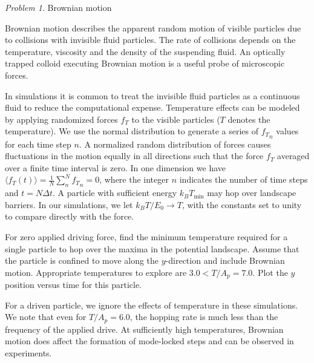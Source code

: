 \documentclass[preprint,showpacs,preprintnumbers,amsmath,amssymb,aps,prb]{revtex4-1}
\theoremstyle{remark}
\newtheorem{problem}{Problem}
\begin{document}
 \begin{problem}{Brownian motion}
  \label{ex:brownian}
  
\noindent Brownian motion describes the apparent random motion     of 
  visible particles  
  due to collisions with invisible fluid particles.
  The rate of collisions depends on the temperature, viscosity
  and the density of 
  the suspending fluid.\cite{Einstein1905}
  An optically trapped colloid executing Brownian motion
  is a useful probe of microscopic forces.\cite{Volpe2013}
  
  In   simulations
  it is common to treat the 
  invisible fluid particles as a continuous fluid
  to reduce the computational expense.
  Temperature effects
  can be modeled by applying randomized forces $f_T$ 
 to the visible particles ($T$ denotes the temperature).
  We use the normal distribution 
  to generate a series of ${f_T}_n$ values for
  each  time step $n$.\cite{numpy}
  A normalized random distribution of forces
  causes fluctuations in the
  motion 
  equally in all
  directions such that the force $f_T$
  averaged over a finite time interval
  is zero.  In one dimension we have 
$
    \langle f_T(t) \rangle = \frac{1}{N} \sum_n^N {f_T}_n = 0$,
  where the integer $n$ indicates the number of  
    time steps and 
  $t = N \Delta t$.
  A particle
  with sufficient energy $k_B T_{\min}$ may 
  hop over landscape
  barriers.
  In our simulations,
  we let   
  $k_B T/E_0 \rightarrow T$,
  with the constants set to unity
  to
  compare directly with the force. 
 
  For zero applied driving force,
  find 
  the minimum temperature required for a single particle
  to hop over the maxima in the potential landscape.
  Assume that the particle is confined to
  move along the $y$-direction and
  include Brownian motion.
  Appropriate temperatures to explore
  are $3.0 < T/A_p = 7.0$.
Plot the $y$ position versus time
  for this particle.
 

  For a driven particle,
  we ignore 
  the effects of temperature 
  in these simulations.  
  We note that even for $T/A_p = 6.0$, 
  the hopping rate
  is much less than the
  frequency of the applied drive.   
  At sufficiently high temperatures,
  Brownian motion does affect 
  the formation of mode-locked steps
  and can be observed in experiments.
 \end{problem}
\end{document}
